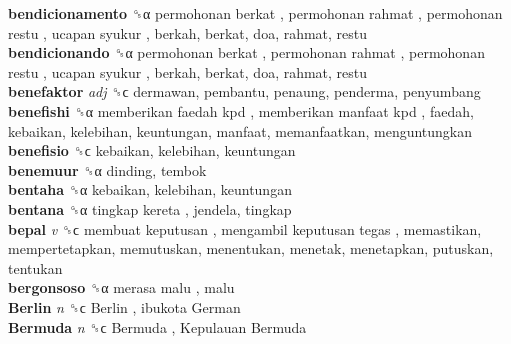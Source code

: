 \textbf{bendicionamento} ␝α   permohonan berkat ,  permohonan rahmat ,  permohonan restu ,  ucapan syukur , berkah, berkat, doa, rahmat, restu  \\
\textbf{bendicionando} ␝α   permohonan berkat ,  permohonan rahmat ,  permohonan restu ,  ucapan syukur , berkah, berkat, doa, rahmat, restu  \\
\textbf{benefaktor} \emph{adj}  ␝ϲ  dermawan, pembantu, penaung, penderma, penyumbang  \\
\textbf{benefishi} ␝α   memberikan faedah kpd ,  memberikan manfaat kpd , faedah, kebaikan, kelebihan, keuntungan, manfaat, memanfaatkan, menguntungkan  \\
\textbf{benefisio} ␝ϲ  kebaikan, kelebihan, keuntungan  \\
\textbf{benemuur} ␝α  dinding, tembok  \\
\textbf{bentaha} ␝α  kebaikan, kelebihan, keuntungan  \\
\textbf{bentana} ␝α   tingkap kereta , jendela, tingkap  \\
\textbf{bepal} \emph{v}  ␝ϲ   membuat keputusan ,  mengambil keputusan tegas , memastikan, mempertetapkan, memutuskan, menentukan, menetak, menetapkan, putuskan, tentukan  \\
\textbf{bergonsoso} ␝α   merasa malu , malu  \\
\textbf{Berlin} \emph{n}  ␝ϲ   Berlin ,  ibukota German   \\
\textbf{Bermuda} \emph{n}  ␝ϲ   Bermuda ,  Kepulauan Bermuda   \\
